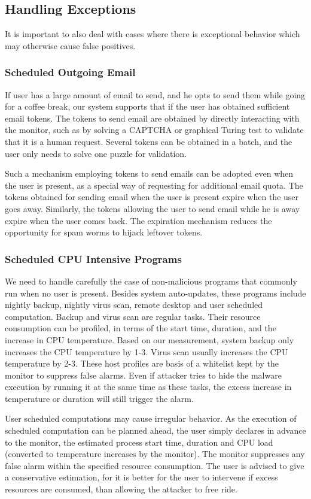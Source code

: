 \subsection{Handling Exceptions}

It is important to also deal with cases where there is exceptional
behavior which may otherwise cause false positives.

\subsubsection{Scheduled Outgoing Email}
If user has a large amount of email to send, and he opts to send them while going for a coffee break, our system supports that if the user has obtained sufficient email tokens. 
The tokens to send email are obtained by directly interacting with the monitor,
such as by solving a CAPTCHA \cite{captcha} or graphical Turing test
to validate that it is a human request.
Several tokens can be obtained in a batch, and the user only needs to solve one puzzle for validation.

Such a mechanism employing tokens to send emails can be adopted even when 
the user is present, as a special way of requesting for additional email quota. The tokens obtained for sending email when the user is present expire when 
the user goes away. 
Similarly, the tokens allowing the user to send email while he is away expire when the user comes back. The expiration mechanism reduces the opportunity 
for spam worms to hijack leftover tokens.

\subsubsection{Scheduled CPU Intensive Programs}
We need to handle carefully the case of non-malicious programs that commonly
run when no user is present. Besides system auto-updates, these
programs include nightly backup, nightly virus scan, remote desktop
and user scheduled computation. Backup and virus scan are regular
tasks. Their resource consumption can be profiled, in terms of the
start time, duration, and the increase in CPU temperature. Based on
our measurement, system backup only increases the CPU temperature by
1-3\degree. Virus scan usually increases the CPU temperature by
2-3\degree. These host profiles are basis of a whitelist kept by
the monitor to suppress false alarms. Even if attacker tries to hide
the malware execution by running it at the same time as these tasks,
the excess increase in temperature or duration will still trigger
the alarm.

User scheduled computations may cause irregular behavior.
As the execution of scheduled computation can be planned ahead, the
user simply declares in advance to the monitor, the estimated process
start time, duration and CPU load
(converted to temperature increases by the monitor).
The monitor suppresses any
false alarm within the specified resource consumption. The user is
advised to give a conservative estimation, for it is better for the
user to intervene if excess resources are consumed, than allowing
the attacker to free ride. 
